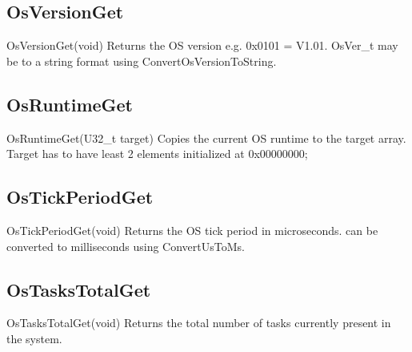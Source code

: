 \subsection{OsVersionGet}
\label{func:OsVersionGet}
\begin{pdfunction}
{OsVersionGet(void) }
{ 
Returns the OS version e.g. 0x0101 = V1.01. OsVer\_t may be 
to a string format using ConvertOsVersionToString. }
\end{pdfunction}

\subsection{OsRuntimeGet}
\label{func:OsRuntimeGet}
\begin{pdfunction}
{OsRuntimeGet(U32\_t target) }
{ 
Copies the current OS runtime to the target array. Target has to have 
least 2 elements initialized at 0x00000000; }
\end{pdfunction}

\subsection{OsTickPeriodGet}
\label{func:OsTickPeriodGet}
\begin{pdfunction}
{OsTickPeriodGet(void) }
{ 
Returns the OS tick period in microseconds. 
can be converted to milliseconds using ConvertUsToMs. }
\end{pdfunction}

\subsection{OsTasksTotalGet}
\label{func:OsTasksTotalGet}
\begin{pdfunction}
{OsTasksTotalGet(void) }
{ 
Returns the total number of tasks currently present in the 
system.}
\end{pdfunction}

